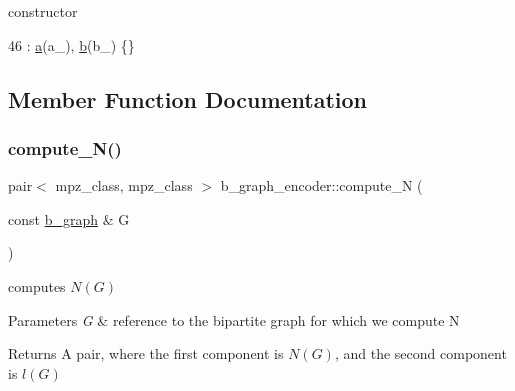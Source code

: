 constructor 


\begin{DoxyCode}
46 : \hyperlink{classb__graph__encoder_afd22d167f495cd85b41397f337c377c2}{a}(a\_), \hyperlink{classb__graph__encoder_a767826e268702e45ab71565e096a52b8}{b}(b\_) \{\}
\end{DoxyCode}


\subsection{Member Function Documentation}
\mbox{\label{classb__graph__encoder_a5a482e6783b10f2d95dd4afc0478eee0}} 
\subsubsection{\texorpdfstring{compute\+\_\+\+N()}{compute\_N()}}
{\footnotesize\ttfamily pair$<$ mpz\+\_\+class, mpz\+\_\+class $>$ b\+\_\+graph\+\_\+encoder\+::compute\+\_\+N (\begin{DoxyParamCaption}\item[{const \hyperlink{classb__graph}{b\+\_\+graph} \&}]{G }\end{DoxyParamCaption})}



computes $N(G)$ 


\begin{DoxyParams}{Parameters}
{\em G} & reference to the bipartite graph for which we compute N \\
\hline
\end{DoxyParams}
\begin{DoxyReturn}{Returns}
A pair, where the first component is $N(G)$, and the second component is $l(G)$ 
\end{DoxyReturn}

